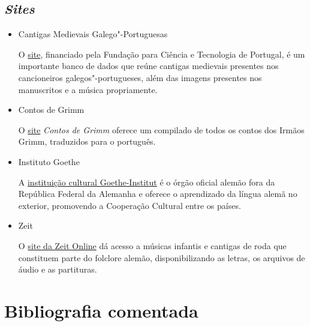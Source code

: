 \documentclass[12pt]{extarticle}
\begin{document}
\subsection{\emph{Sites}}

\begin{itemize}
\item Cantigas Medievais Galego"-Portuguesas

O \href{https://cantigas.fcsh.unl.pt/index.asp}{site}, financiado pela Fundação para Ciência e Tecnologia de Portugal, é um importante banco de dados
que reúne cantigas medievais presentes nos cancioneiros galegos"-portugueses, além das imagens presentes 
nos manuscritos e a música propriamente.

\item Contos de Grimm

O \href{https://www.grimmstories.com/pt/grimm_contos/index}{site} \emph{Contos de Grimm} oferece um compilado de todos os contos dos Irmãos Grimm, traduzidos para o português.

\item Instituto Goethe

A \href{http://www.goethe.de/rio}{instituição cultural Goethe-Institut} é o órgão oficial alemão fora da República Federal da Alemanha e 
oferece o aprendizado da língua alemã no exterior, promovendo a Cooperação Cultural entre os países.

\item Zeit

O \href{https://www.zeit.de/serie/kinderlieder?fbclid=IwAR0YTdmrrM24sDcmak__AxviJPibv0_Bxf9sx9XkX7g-4VxcKbNbRbVPrew&utm_referrer=https\%3A\%2F\%2Fl.facebook.com\%2F}{site da Zeit Online} dá acesso a músicas infantis e cantigas de roda que constituem parte do folclore alemão, 
disponibilizando as letras, os arquivos de áudio e as partituras.
\end{itemize}


\section{Bibliografia comentada}
\end{document}
